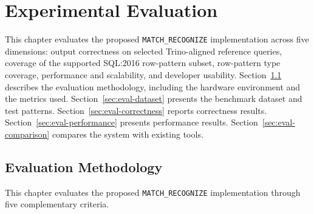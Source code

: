 \chapter{Experimental Evaluation}
\label{chap:evaluation}

This chapter evaluates the proposed \texttt{MATCH\_RECOGNIZE}
implementation across five dimensions: output correctness on selected
Trino-aligned reference queries, coverage of the supported SQL:2016
row-pattern subset, row-pattern type coverage, performance and
scalability, and developer usability.
Section~\ref{sec:eval-methodology}
describes the evaluation methodology, including the hardware
environment and the metrics used.
Section~\ref{sec:eval-dataset} presents the benchmark dataset and
test patterns.
Section~\ref{sec:eval-correctness} reports correctness results.
Section~\ref{sec:eval-performance} presents performance results.
Section~\ref{sec:eval-comparison} compares the system with existing
tools.

\section{Evaluation Methodology}
\label{sec:eval-methodology}

This chapter evaluates the proposed \texttt{MATCH\_RECOGNIZE} implementation
through five complementary criteria.

